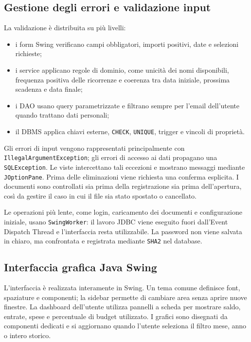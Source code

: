 \documentclass[11pt,a4paper]{article}
\begin{document}
\subsection{Gestione degli errori e validazione input}
La validazione è distribuita su più livelli:
\begin{itemize}
    \item i form Swing verificano campi obbligatori, importi positivi, date e selezioni richieste;
    \item i service applicano regole di dominio, come unicità dei nomi disponibili, frequenza positiva delle ricorrenze e coerenza tra data iniziale, prossima scadenza e data finale;
    \item i DAO usano query parametrizzate e filtrano sempre per l'email dell'utente quando trattano dati personali;
    \item il DBMS applica chiavi esterne, \texttt{CHECK}, \texttt{UNIQUE}, trigger e vincoli di proprietà.
\end{itemize}

Gli errori di input vengono rappresentati principalmente con \texttt{IllegalArgumentException}; gli errori di accesso ai dati propagano una \texttt{SQLException}. Le viste intercettano tali eccezioni e mostrano messaggi mediante \texttt{JOptionPane}. Prima delle eliminazioni viene richiesta una conferma esplicita. I documenti sono controllati sia prima della registrazione sia prima dell'apertura, così da gestire il caso in cui il file sia stato spostato o cancellato.

Le operazioni più lente, come login, caricamento dei documenti e configurazione iniziale, usano \texttt{SwingWorker}: il lavoro JDBC viene eseguito fuori dall'Event Dispatch Thread e l'interfaccia resta utilizzabile. La password non viene salvata in chiaro, ma confrontata e registrata mediante \texttt{SHA2} nel database.

\subsection{Interfaccia grafica Java Swing}
L'interfaccia è realizzata interamente in Swing. Un tema comune definisce font, spaziature e componenti; la sidebar permette di cambiare area senza aprire nuove finestre. La dashboard dell'utente utilizza pannelli a scheda per mostrare saldo, entrate, spese e percentuale di budget utilizzato. I grafici sono disegnati da componenti dedicati e si aggiornano quando l'utente seleziona il filtro mese, anno o intero storico.
\end{document}
